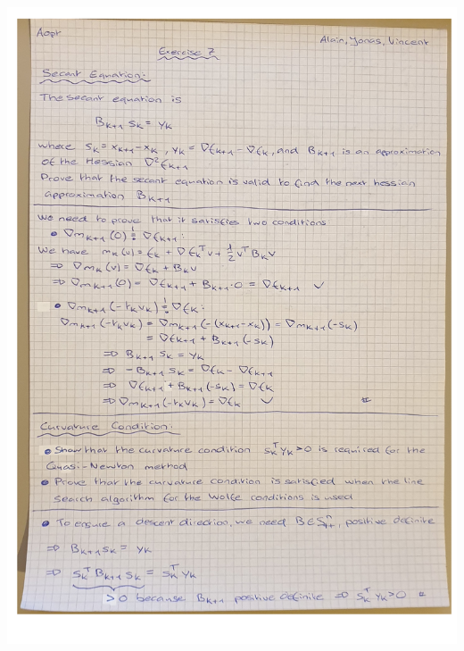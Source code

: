 \documentclass[multi=page,crop,border=15pt,varwidth=120cm]{standalone}
\begin{document}
\begin{page}%
    \hspace*{-0.2in}
    \includegraphics[page=2,trim={0 15cm 0 0},clip]{../part1}
    \hspace*{-0.2in}
\end{page}



\end{document}
